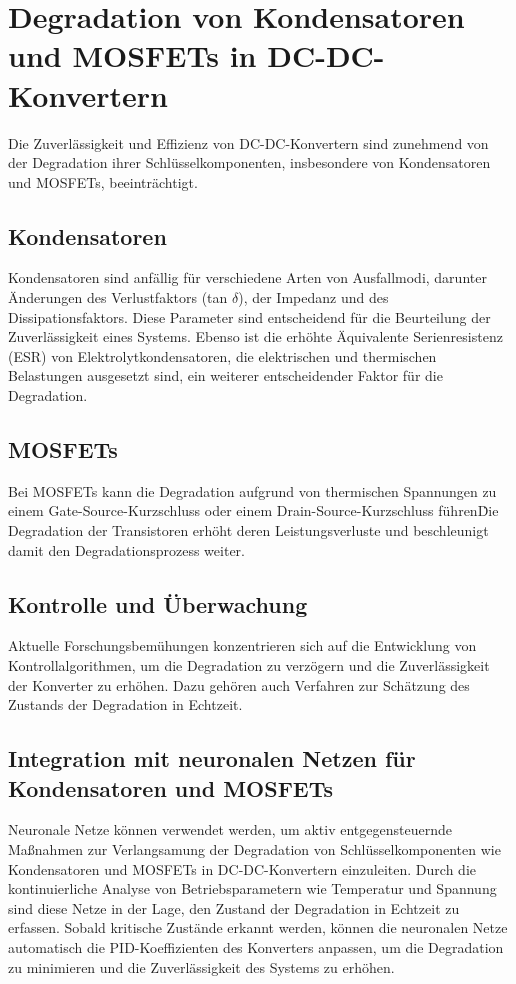 \section{Degradation von Kondensatoren und MOSFETs in DC-DC-Konvertern}

Die Zuverlässigkeit und Effizienz von DC-DC-Konvertern sind zunehmend von der Degradation ihrer Schlüsselkomponenten, insbesondere von Kondensatoren und MOSFETs, beeinträchtigt.

\subsection{Kondensatoren}

Kondensatoren sind anfällig für verschiedene Arten von Ausfallmodi, darunter Änderungen des Verlustfaktors (tan $\delta$), der Impedanz und des Dissipationsfaktors. Diese Parameter sind entscheidend für die Beurteilung der Zuverlässigkeit eines Systems. Ebenso ist die erhöhte Äquivalente Serienresistenz (ESR) von Elektrolytkondensatoren, die elektrischen und thermischen Belastungen ausgesetzt sind, ein weiterer entscheidender Faktor für die Degradation.\cite[pp. 1]{jeong2023degradation}

\subsection{MOSFETs}

Bei MOSFETs kann die Degradation aufgrund von thermischen Spannungen zu einem Gate-Source-Kurzschluss oder einem Drain-Source-Kurzschluss führen\. Die Degradation der Transistoren erhöht deren Leistungsverluste und beschleunigt damit den Degradationsprozess weiter.\cite[pp. 190]{wensdesign2022}



\subsection{Kontrolle und Überwachung}

Aktuelle Forschungsbemühungen konzentrieren sich auf die Entwicklung von Kontrollalgorithmen, um die Degradation zu verzögern und die Zuverlässigkeit der Konverter zu erhöhen. Dazu gehören auch Verfahren zur Schätzung des Zustands der Degradation in Echtzeit.
\cite[p.~24, p.~310-311]{choi2013pulsewidth}

\subsection{Integration mit neuronalen Netzen für Kondensatoren und MOSFETs}

Neuronale Netze können verwendet werden, um aktiv entgegensteuernde Maßnahmen zur Verlangsamung der Degradation von Schlüsselkomponenten wie Kondensatoren und MOSFETs in DC-DC-Konvertern einzuleiten. Durch die kontinuierliche Analyse von Betriebsparametern wie Temperatur und Spannung sind diese Netze in der Lage, den Zustand der Degradation in Echtzeit zu erfassen. Sobald kritische Zustände erkannt werden, können die neuronalen Netze automatisch die PID-Koeffizienten des Konverters anpassen, um die Degradation zu minimieren und die Zuverlässigkeit des Systems zu erhöhen.
\cite[p.~22]{morales2020grokking}
